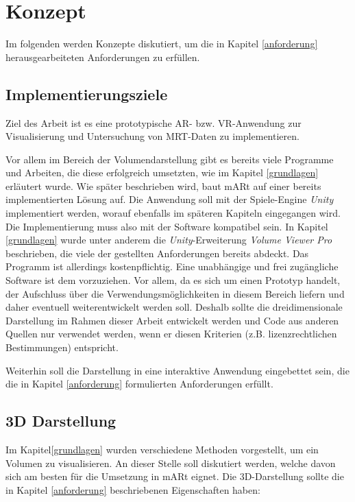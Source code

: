 
\chapter{Konzept}
\label{konzept}

Im folgenden werden Konzepte diskutiert, um die in Kapitel \ref{anforderung} herausgearbeiteten Anforderungen zu erfüllen.

\section{Implementierungsziele}
Ziel des Arbeit ist es eine prototypische AR- bzw. VR-Anwendung zur Visualisierung und Untersuchung von MRT-Daten zu implementieren. 

Vor allem im Bereich der Volumendarstellung gibt es bereits viele Programme und Arbeiten, die diese erfolgreich umsetzten, wie im Kapitel \ref{grundlagen} erläutert wurde.
Wie später beschrieben wird, baut mARt auf einer bereits implementierten Lösung auf. Die Anwendung soll mit der Spiele-Engine \textit{Unity}  implementiert werden, worauf ebenfalls im späteren Kapiteln eingegangen wird. Die Implementierung muss also mit der Software kompatibel sein. In Kapitel \ref{grundlagen} wurde unter anderem die \textit{Unity}-Erweiterung \textit{Volume Viewer Pro} beschrieben, die viele der gestellten Anforderungen bereits abdeckt. Das Programm ist allerdings kostenpflichtig. Eine unabhängige und frei zugängliche Software ist dem vorzuziehen. Vor allem, da es sich um einen Prototyp handelt, der Aufschluss über die Verwendungsmöglichkeiten in diesem Bereich liefern und daher eventuell weiterentwickelt werden soll. Deshalb sollte die dreidimensionale Darstellung im Rahmen dieser Arbeit entwickelt werden und Code aus anderen Quellen nur verwendet werden, wenn er diesen Kriterien (z.B. lizenzrechtlichen Bestimmungen) entspricht.

Weiterhin soll die Darstellung in eine interaktive Anwendung eingebettet sein, die die in Kapitel \ref{anforderung} formulierten Anforderungen erfüllt.

\section{3D Darstellung}
\label{3dDarstellung}

Im Kapitel\ref{grundlagen} wurden verschiedene Methoden vorgestellt, um ein Volumen zu visualisieren. An dieser Stelle soll diskutiert werden, welche davon sich am besten für die Umsetzung in mARt eignet.
Die 3D-Darstellung sollte die in Kapitel \ref{anforderung} beschriebenen Eigenschaften haben:

